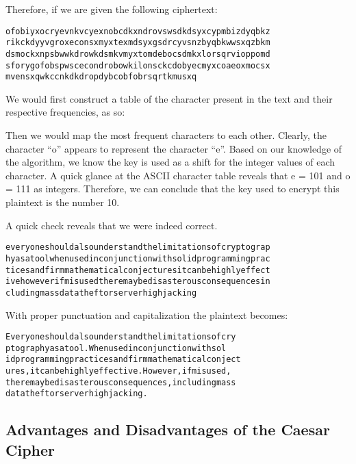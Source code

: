 \documentclass[12pt, a4paper, draft]{report}
\begin{document}

Therefore, if we are given the following ciphertext:


\begin{alltt}
ofobiyxocryevnkvcyexnobcdkxndrovswsdkdsyxcypmbizdyqbkz
rikckdyyvgroxeconsxmyxtexmdsyxgsdrcyvsnzbyqbkwwsxqzbkm
dsmockxnpsbwwkdrowkdsmkvmyxtomdebocsdmkxlorsqrvioppomd
sforygofobspwscecondrobowkilonsckcdobyecmyxcoaeoxmocsx
mvensxqwkccnkdkdropdybcobfobrsqrtkmusxq
\end{alltt}

We would first construct a table of the character present in the text and
their respective frequencies, as so:


Then we would map the most frequent characters to each other.
Clearly, the character ``o'' appears to represent the character ``e''.
Based on our knowledge of the algorithm, we know the key is used as
a shift for the integer values of each character. A quick glance at the
ASCII character table reveals that e = 101 and o = 111 as integers.
Therefore, we can conclude that the key used to encrypt this plaintext
is the number 10.

A quick check reveals that we were indeed correct.

\begin{alltt}
everyoneshouldalsounderstandthelimitationsofcryptograp
hyasatoolwhenusedinconjunctionwithsolidprogrammingprac
ticesandfirmmathematicalconjecturesitcanbehighlyeffect
ivehoweverifmisusedtheremaybedisasterousconsequencesin
cludingmassdatatheftorserverhighjacking
\end{alltt}

With proper punctuation and capitalization the plaintext becomes:

\begin{alltt}
Everyone should also understand the limitations of cry
ptography as a tool. When used in conjunction with sol
id programming practices and firm mathematical conject
ures, it can be highly effective. However, if misused,
there may be disasterous consequences, including mass
data theft or server highjacking.
\end{alltt}

\subsection{Advantages and Disadvantages of the Caesar Cipher}
\end{document}

